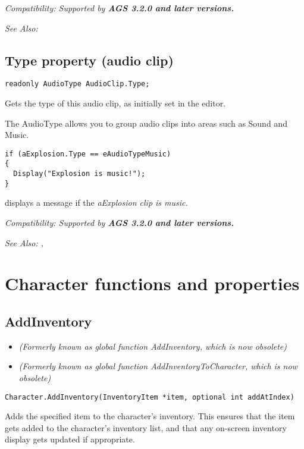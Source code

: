 \it{Compatibility:} Supported by \bf{AGS 3.2.0} and later versions.

\it{See Also:} 


\subsection{Type property (audio clip)}\label{AudioClip.Type}%

\begin{verbatim}
readonly AudioType AudioClip.Type;
\end{verbatim}
Gets the type of this audio clip, as initially set in the editor.

The AudioType allows you to group audio clips into areas such as Sound and Music.

\begin{verbatim}
if (aExplosion.Type == eAudioTypeMusic)
{
  Display("Explosion is music!");
}
\end{verbatim}
displays a message if the \it{aExplosion} clip is music.

\it{Compatibility:} Supported by \bf{AGS 3.2.0} and later versions.

\it{See Also:} ,


\section{Character functions and properties}%


\subsection{AddInventory}\label{Character.AddInventory}%

\begin{itemize}
\item \it{(Formerly known as global function AddInventory, which is now obsolete)}
\item \it{(Formerly known as global function AddInventoryToCharacter, which is now obsolete)}
\end{itemize}

\begin{verbatim}
Character.AddInventory(InventoryItem *item, optional int addAtIndex)
\end{verbatim}
Adds the specified item to the character's inventory. This
ensures that the item gets added to the character's inventory list, and that
any on-screen inventory display gets updated if appropriate.

